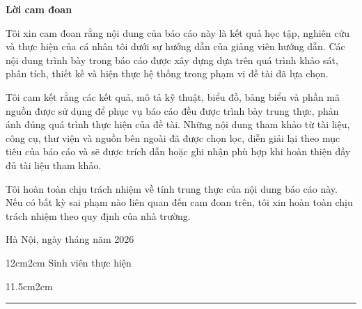 \setcounter{page}{1}
\begin{center}
\textbf{\large{Lời cam đoan}}
\end{center}

Tôi xin cam đoan rằng nội dung của báo cáo này là kết quả học tập, nghiên cứu và thực hiện của cá nhân tôi dưới sự hướng dẫn của giảng viên hướng dẫn. Các nội dung trình bày trong báo cáo được xây dựng dựa trên quá trình khảo sát, phân tích, thiết kế và hiện thực hệ thống trong phạm vi đề tài đã lựa chọn.

Tôi cam kết rằng các kết quả, mô tả kỹ thuật, biểu đồ, bảng biểu và phần mã nguồn được sử dụng để phục vụ báo cáo đều được trình bày trung thực, phản ánh đúng quá trình thực hiện của đề tài. Những nội dung tham khảo từ tài liệu, công cụ, thư viện và nguồn bên ngoài đã được chọn lọc, diễn giải lại theo mục tiêu của báo cáo và sẽ được trích dẫn hoặc ghi nhận phù hợp khi hoàn thiện đầy đủ tài liệu tham khảo.

Tôi hoàn toàn chịu trách nhiệm về tính trung thực của nội dung báo cáo này. Nếu có bất kỳ sai phạm nào liên quan đến cam đoan trên, tôi xin hoàn toàn chịu trách nhiệm theo quy định của nhà trường.

\begin{flushright}
Hà Nội, ngày \hspace{1cm} tháng \hspace{1cm} năm 2026
\end{flushright}

\begin{changemargin}{12cm}{2cm}
Sinh viên thực hiện
\\[2cm]
\end{changemargin}

\begin{changemargin}{11.5cm}{2cm}
\rule{4cm}{0.4pt}
\end{changemargin}

